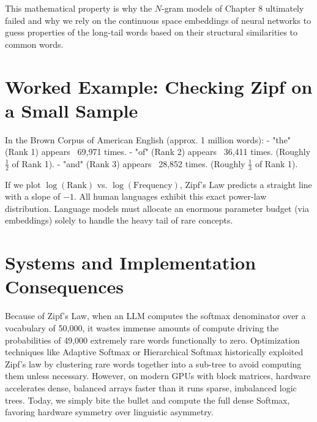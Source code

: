 This mathematical property is why the $N$-gram models of Chapter 8 ultimately failed and why we rely on the continuous space embeddings of neural networks to guess properties of the long-tail words based on their structural similarities to common words.

\section{Worked Example: Checking Zipf on a Small Sample}
\label{ch:05:sec:example}

In the Brown Corpus of American English (approx. 1 million words):
- "the" (Rank 1) appears ~69,971 times.
- "of" (Rank 2) appears ~36,411 times. (Roughly $\frac{1}{2}$ of Rank 1).
- "and" (Rank 3) appears ~28,852 times. (Roughly $\frac{1}{3}$ of Rank 1).

If we plot $\log(\text{Rank})$ vs. $\log(\text{Frequency})$, Zipf's Law predicts a straight line with a slope of $-1$. All human languages exhibit this exact power-law distribution. Language models must allocate an enormous parameter budget (via embeddings) solely to handle the heavy tail of rare concepts.

\section{Systems and Implementation Consequences}
\label{ch:05:sec:systems}

Because of Zipf's Law, when an LLM computes the softmax denominator over a vocabulary of 50,000, it wastes immense amounts of compute driving the probabilities of 49,000 extremely rare words functionally to zero. Optimization techniques like Adaptive Softmax or Hierarchical Softmax historically exploited Zipf's law by clustering rare words together into a sub-tree to avoid computing them unless necessary. However, on modern GPUs with block matrices, hardware accelerates dense, balanced arrays faster than it runs sparse, imbalanced logic trees. Today, we simply bite the bullet and compute the full dense Softmax, favoring hardware symmetry over linguistic asymmetry.

